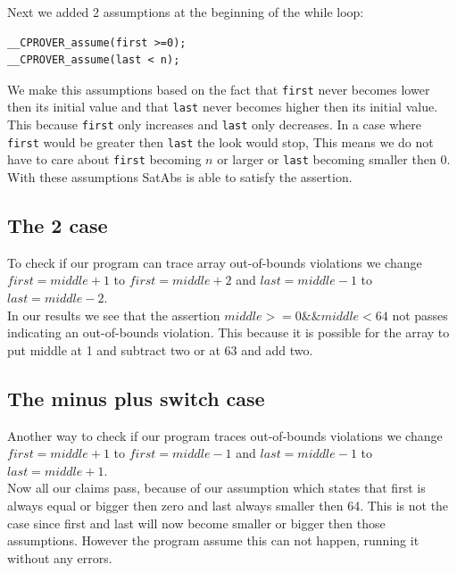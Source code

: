 \documentclass[a4paper]{article}
\begin{document}
	Next we added 2 assumptions at the beginning of the while loop:
	\begin{lstlisting}
__CPROVER_assume(first >=0);
__CPROVER_assume(last < n);
	\end{lstlisting}
	We make this assumptions based on the fact that \texttt{first} never becomes lower then its initial value and that \texttt{last} never becomes higher then its initial value. This because \texttt{first} only increases and \texttt{last} only decreases. In a case where \texttt{first} would be greater then \texttt{last} the look would stop, This means we do not have to care about \texttt{first} becoming $n$ or larger or \texttt{last} becoming smaller then $0$.	
	With these assumptions SatAbs is able to satisfy the assertion.
	
	\subsection{The 2 case}
	To check if our program can trace array out-of-bounds violations we change  $first = middle +1$ to $first = middle + 2$ and $last = middle - 1$ to $last = middle - 2$. \\
	In our results we see that the assertion $middle >= 0  \&\&  middle < 64$ not passes indicating an out-of-bounds violation. This because it is possible for the array to put middle at 1 and subtract two or at 63 and add two.
	
	
	\subsection{The minus plus switch case}
	Another way to check if our program traces out-of-bounds violations we change $first = middle +1$ to $first = middle - 1$ and $last = middle - 1$ to $last = middle + 1$.\\
	Now all our claims pass, because of our assumption which states that first is always equal or bigger then zero and last always smaller then 64. This is not the case since first and last will now become smaller or bigger then those assumptions. However the program assume this can not happen, running it without any errors.
	
	
\end{document}
